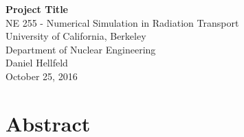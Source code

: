 \documentclass[10pt]{article}
\begin{document}
\begin{centering}
\textbf{Project Title}\\
\vspace{11pt}
NE 255 - Numerical Simulation in Radiation Transport\\
University of California, Berkeley\\
Department of Nuclear Engineering\\
\vspace{11pt}
Daniel Hellfeld\\
\vspace{11pt}
October 25, 2016 \\
\end{centering}


\section*{Abstract}

\lipsum[1]
\end{document}
